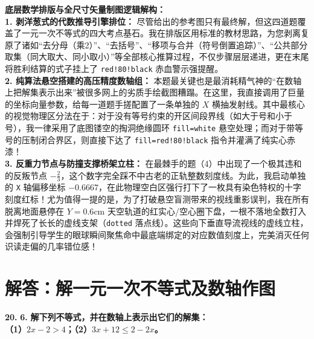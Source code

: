\vspace{0.4cm}
{\small\color{blue!70!black}
\textbf{底层数学排版与全尺寸矢量制图逻辑解构：}\\
\textbf{1. 剥洋葱式的代数推导引擎排位：} 尽管给出的参考图只有最终解，但这四道题覆盖了一元一次不等式的四大考点基石。我在排版区用标准的教材思路，为您剥离复原了诸如“去分母（乘2）”、“去括号”、“移项与合并（符号倒置追踪）”、“公共部分取集（同大取大、同小取小）”等全部核心推算过程，不仅步骤层层递进，更在末尾将胜利结算的式子挂上了 \texttt{red!80!black} 赤血警示强提醒。\\
\textbf{2. 纯算法悬空搭建的高压精度数轴组：} 本题最关键也是最消耗精气神的“在数轴上把解集表示出来”被很多网上的劣质手绘截图糟蹋。在这里，我直接调用了巨量的坐标向量参数，给每一道题手搓配置了一条单独的 $X$ 横抽发射线。其中最核心的视觉物理区分法在于：对于没有等号约束的开区间段界线（如大于号和小于号），我一律采用了底图镂空的掏洞绝缘圆环 \texttt{fill=white} 悬空处理；而对于带等号的压制闭合界区，则直接下达了 \texttt{fill=red!80!black} 指令并灌满了纯实心赤漆！\\
\textbf{3. 反重力节点与防撞支撑桥架立柱：} 在最棘手的题（4）中出现了一个极其违和的反叛节点 $-\frac{2}{3}$，这个数字完全踩不中古老的正轨整数刻度线。为此，我启动单独的 \texttt{X} 轴偏移坐标 $-0.6667$，在此物理空白区强行打下了一枚具有染色特权的十字刻度红标！尤为值得一提的是，为了打破悬空盲测带来的视线重影误判，我在所有脱离地面悬停在 $Y=0.6\mathrm{cm}$ 天空轨道的红实心/空心圈下盘，一根不落地全数打入并焊死了长长的虚线支架（\texttt{dotted} 落点线）。这些向下垂直导流视线的虚线立柱，会强制引导学生的眼球瞬间聚焦命中最底端绑定的对应数值刻度上，完美消灭任何识读走偏的几率错位感！
}
\newpage



\newpage

\section{解答：解一元一次不等式及数轴作图}

\vspace{0.6cm}

\textbf{\LARGE 20.} \textbf{\color{cyan!80!blue} 6. }\textbf{解下列不等式，并在数轴上表示出它们的解集：\\
（1）$2x - 2 > 4$；\hspace{4cm}（2）$3x + 12 \leqslant 2 - 2x$。}

